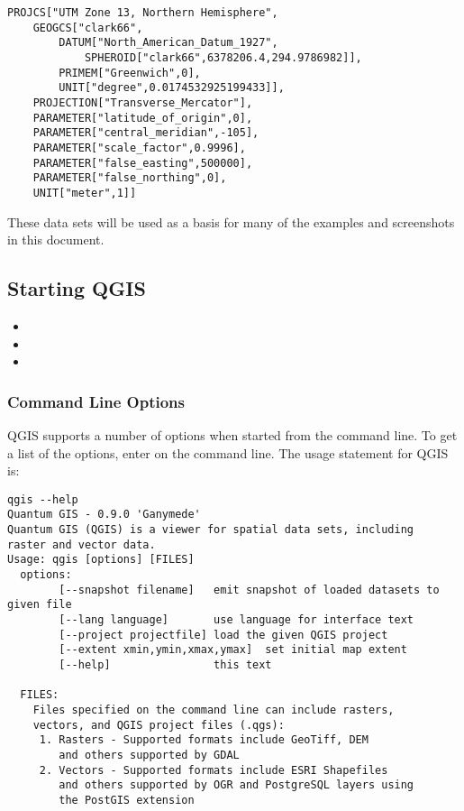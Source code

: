 \begin{verbatim}
PROJCS["UTM Zone 13, Northern Hemisphere",
    GEOGCS["clark66",
        DATUM["North_American_Datum_1927",
            SPHEROID["clark66",6378206.4,294.9786982]],
        PRIMEM["Greenwich",0],
        UNIT["degree",0.0174532925199433]],
    PROJECTION["Transverse_Mercator"],
    PARAMETER["latitude_of_origin",0],
    PARAMETER["central_meridian",-105],
    PARAMETER["scale_factor",0.9996],
    PARAMETER["false_easting",500000],
    PARAMETER["false_northing",0],
    UNIT["meter",1]]
\end{verbatim}

These data sets will be used as a basis for many of the examples and 
screenshots in this document.

\subsection{Starting QGIS}\label{label_startinqgis}

\begin{itemize}
\item {} 
\item {}
\item {}
\end{itemize} 

\subsubsection{Command Line Options}
\label{label_commandline}

QGIS supports a number of options when started from the command line. To
get a list of the options, enter  on the command line.
The usage statement for QGIS is:

\small
\begin{verbatim}
qgis --help
Quantum GIS - 0.9.0 'Ganymede'
Quantum GIS (QGIS) is a viewer for spatial data sets, including
raster and vector data.
Usage: qgis [options] [FILES]
  options:
        [--snapshot filename]   emit snapshot of loaded datasets to given file
        [--lang language]       use language for interface text
        [--project projectfile] load the given QGIS project
        [--extent xmin,ymin,xmax,ymax]  set initial map extent
        [--help]                this text

  FILES:
    Files specified on the command line can include rasters,
    vectors, and QGIS project files (.qgs):
     1. Rasters - Supported formats include GeoTiff, DEM
        and others supported by GDAL
     2. Vectors - Supported formats include ESRI Shapefiles
        and others supported by OGR and PostgreSQL layers using
        the PostGIS extension
\end{verbatim}
\normalsize

